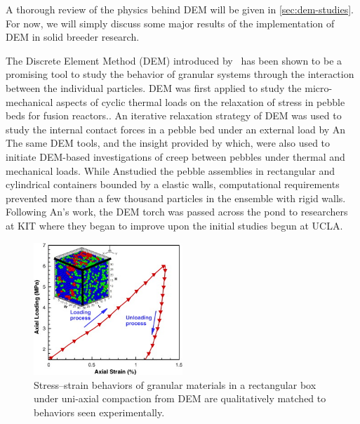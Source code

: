 A thorough review of the physics behind DEM will be given in \cref{sec:dem-studies}. For now, we will simply discuss some major results of the implementation of DEM in solid breeder research.

The Discrete Element Method (DEM) introduced by~\cite{Cundall1979} has been shown to be a promising tool to study the behavior of granular systems through the interaction between the individual particles. DEM was first applied to study the micro-mechanical aspects of cyclic thermal loads on the relaxation of stress in pebble beds for fusion reactors.\cite{Lu2000b,Ying2002}. An iterative relaxation strategy of DEM was used to study the internal contact forces in a pebble bed under an external load by An\etal\cite{An20072233} The same DEM tools, and the insight provided by which, were also used to initiate DEM-based investigations of creep between pebbles under thermal and mechanical loads.\cite{An20071393} While An\etal studied the pebble assemblies in rectangular and cylindrical containers bounded by a elastic walls, computational requirements prevented more than a few thousand particles in the ensemble with rigid walls.\cite{An20072233} Following An's work, the DEM torch was passed across the pond to researchers at KIT where they began to improve upon the initial studies begun at UCLA.

\begin{figure}[!ht]
	\centering
	\includegraphics[width=0.5\textwidth]{chapters/figures/1-s2.0-S092037960700049X-gr1.jpg}
	\caption{Stress–strain behaviors of granular materials in a rectangular box under uni-axial compaction from DEM are qualitatively matched to behaviors seen experimentally.}
\label{fig:an-uniaxial-compression}
\end{figure}

